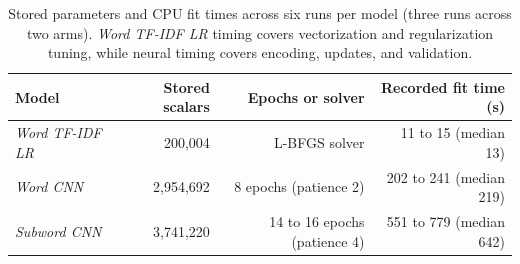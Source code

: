 \begin{table}[H]\centering\normalsize\setlength{\tabcolsep}{5pt}
\begin{tabular}{lrrr}\toprule
Model & Stored scalars & Epochs or solver & Recorded fit time (s) \\\midrule
\textit{Word TF-IDF LR} & 200,004 & L-BFGS solver & 11 to 15 (median 13) \\
\textit{Word CNN} & 2,954,692 & 8 epochs (patience 2) & 202 to 241 (median 219) \\
\textit{Subword CNN} & 3,741,220 & 14 to 16 epochs (patience 4) & 551 to 779 (median 642) \\
\bottomrule
\end{tabular}
\caption[Parameters and fit times]{Stored parameters and CPU fit times across six runs per model (three runs across two arms). \textit{Word TF-IDF LR} timing covers vectorization and regularization tuning, while neural timing covers encoding, updates, and validation.}
\label{tab:fit-cost-review}
\end{table}
